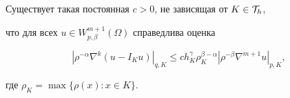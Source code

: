 \begin{thm}\label{E-I_K}


Существует такая постоянная $c > 0$, не зависящая от $K \in {\cal T}_h$, 


что для всех $u \in W^{m+1}_{p,\beta}(\Omega)$ справедлива оценка 


$$


{|\rho^{-\alpha} \nabla ^k (u-I_Ku)|}_{q,K} \le c h_K^\gamma 


\rho_K^{\beta-\alpha}{|\rho^{-\beta}\nabla^{m+1}u|}_{p,K}, 


$$ 


где $\rho_K=\max\{\rho(x): x \in K \}.$ 


\end{thm}





